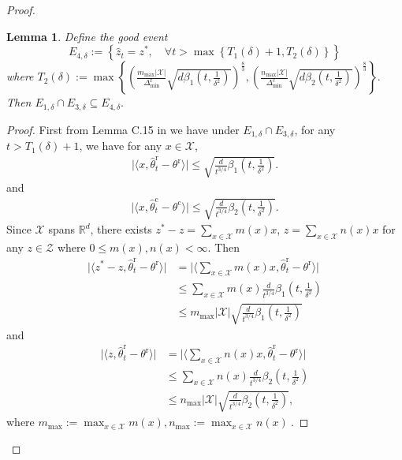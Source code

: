 \documentclass[accepted]{uai2025} %
\theoremstyle{plain}
\newtheorem{lemma}[theorem]{Lemma}
\theoremstyle{definition}
\theoremstyle{remark}
\newcommand{\thetac}{\theta^{\mathrm{c}}}
\newcommand{\Deltac}{\Delta^{\mathrm{c}}}
\newcommand{\Deltar}{\Delta^{\mathrm{r}}}
\newcommand{\thetar}{\theta^{\mathrm{r}}}
\newcommand{\hthetact}{\hat{\theta}_t^{\mathrm{c}}}
\newcommand{\hthetart}{\hat{\theta}_t^{\mathrm{r}}}
\newcommand{\cbr}[1]{\left\{#1\right\}}
\begin{document}
\begin{proof}
\begin{lemma}
    Define the good event $$E_{4,\delta}:=\cbr{\hat{z}_t=z^*,\quad \forall t> \max \cbr{T_1(\delta)+1, T_2(\delta)}}$$ where $T_2(\delta):= \max \cbr{(\frac{m_\text{max} |\mathcal{X}| }{\Deltar_\text{min}} \sqrt{d\beta_1 (t, \frac{1}{\delta^2})})^{\frac{8}{3}}, (\frac{ n_\text{max}|\mathcal{X}|}{\Deltac_\text{min}}\sqrt{d\beta_2 (t, \frac{1}{\delta^2})})^{\frac{8}{3}}}.$ 
    Then $E_{1,\delta}\cap E_{3,\delta} \subseteq E_{4,\delta}.$
\end{lemma}
\begin{proof}
    First from Lemma C.15 in \cite{li2024optimal} we have under $E_{1,\delta}\cap E_{3,\delta}$, for any $t> T_1(\delta)+1$, we have for any $x\in \mathcal{X}$,
    \begin{align}
    \label{eq:concentration:reward}
        \lvert\langle x, \hthetart - \thetar \rangle\rvert \leq \sqrt{\frac{d}{t^{3/4}} \beta_1(t, \frac{1}{\delta^2})}.
    \end{align}
    and
    \begin{align*}
        \lvert\langle x, \hthetact - \thetac \rangle \rvert\leq \sqrt{\frac{d}{t^{3/4}} \beta_2(t, \frac{1}{\delta^2})}.
    \end{align*}
    Since $\mathcal{X}$ spans $\mathbb{R}^d$,  there exists $z^*-z=\sum_{x\in \mathcal{X}} m(x) x$, $z=\sum_{x\in \mathcal{X}} n(x) x$ for any $z\in \mathcal{Z}$ where $0\le m(x), n(x)<\infty$.
Then 
\begin{align*}
    \lvert\langle z^*-z, \hthetart - \thetar \rangle\rvert &=\bigg\lvert\Big\langle \sum_{x\in \mathcal{X}} m(x) x, \hthetart - \thetar \Big\rangle\bigg\rvert
    \\&\le \sum_{x\in \mathcal{X}} m(x) \frac{d}{t^{3/4}} \beta_1(t, \frac{1}{\delta^2})
    \\&\le m_\text{max} |\mathcal{X}|\sqrt{\frac{d }{t^{3/4}} \beta_1(t, \frac{1}{\delta^2})}
\end{align*}
and
\begin{align*}
    \lvert\langle z, \hthetart - \thetar \rangle\rvert &=\bigg\lvert\Big\langle \sum_{x\in \mathcal{X}} n(x) x, \hthetart - \thetar\Big\rangle\bigg\rvert
    \\&\le \sum_{x\in \mathcal{X}} n(x) \frac{d}{t^{3/4}} \beta_2(t, \frac{1}{\delta^2})
    \\&\le n_\text{max} |\mathcal{X}|\sqrt{\frac{d }{t^{3/4}} \beta_2(t, \frac{1}{\delta^2})},
\end{align*}
where $m_\text{max}:=\max_{x\in\mathcal{X}} m(x), n_\text{max}:=\max_{x\in\mathcal{X}} n(x)~.$


\end{proof}
\end{proof}
\end{document}
